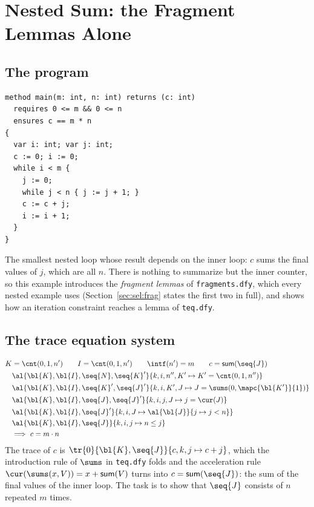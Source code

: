 \section{Nested Sum: the Fragment Lemmas Alone}\label{sec:nsum}

\subsection{The program}
\begin{lstlisting}
method main(m: int, n: int) returns (c: int)
  requires 0 <= m && 0 <= n
  ensures c == m * n
{
  var i: int; var j: int;
  c := 0; i := 0;
  while i < m {
    j := 0;
    while j < n { j := j + 1; }
    c := c + j;
    i := i + 1;
  }
}
\end{lstlisting}
The smallest nested loop whose result depends on the inner loop: $c$ sums the final values of $j$,
which are all $n$. There is nothing to summarize but the inner counter, so this example introduces the
\emph{fragment lemmas} of \texttt{fragments.dfy}, which every nested example uses (Section~\ref{sec:sel:frag}
states the first two in full), and shows how an iteration constraint reaches a lemma of \texttt{teq.dfy}.

\subsection{The trace equation system}
\begin{align}
  K &= \cnt(0, 1, n') \qquad I = \cnt(0, 1, n') \qquad \intf(n') = m \qquad c = \mathsf{sum}(\seq{J}) \label{eq:ns0}\\
  &\al{\bl{K}, \bl{I}, \seq{N}, \seq{K}'}{k, i, n'', K' \mapsto K' = \cnt(0, 1, n'')} \label{eq:ns1}\\
  &\al{\bl{K}, \bl{I}, \seq{K}', \seq{J}'}{k, i, K', J \mapsto J = \sums(0, \mapc{\bl{K'}}{1})} \label{eq:ns2}\\
  &\al{\bl{K}, \bl{I}, \seq{J}, \seq{J}'}{k, i, j, J \mapsto j = \cur(J)} \label{eq:ns3}\\
  &\al{\bl{K}, \bl{I}, \seq{J}'}{k, i, J \mapsto \al{\bl{J}}{j \mapsto j < n}} \label{eq:ns4}\\
  &\al{\bl{K}, \bl{I}, \seq{J}}{k, i, j \mapsto n \le j} \label{eq:ns5}\\
  &\Longrightarrow\ c = m \cdot n \nonumber
\end{align}
The trace of $c$ is $\tr{0}{\bl{K}, \seq{J}}{c, k, j \mapsto c + j}$, which the introduction rule of
$\sums$ in \texttt{teq.dfy} folds and the acceleration rule $\cur(\sums(x, V)) = x + \mathsf{sum}(V)$
turns into $c = \mathsf{sum}(\seq{J})$: the sum of the final values of the inner loop. The task is to
show that $\seq{J}$ consists of $n$ repeated $m$ times.

